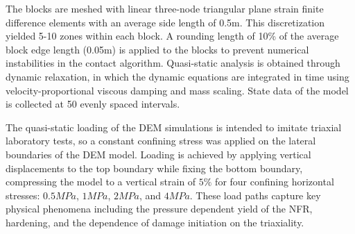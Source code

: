 The blocks are meshed with linear three-node triangular plane strain finite difference elements with an average side length of 0.5m. This discretization yielded 5-10 zones within each block. A rounding length of 10\% of the average block edge length (0.05m) is applied to the blocks to prevent numerical instabilities in the contact algorithm. Quasi-static analysis is obtained through dynamic relaxation, in which the dynamic equations are integrated in time using velocity-proportional viscous damping and mass scaling. State data of the model is collected at 50 evenly spaced intervals. 

The quasi-static loading of the DEM simulations is intended to imitate triaxial laboratory tests, so a constant confining stress was applied on the lateral boundaries of the DEM model. Loading is achieved by applying vertical displacements to the top boundary while fixing the bottom boundary, compressing the model to a vertical strain of $5\%$ for four confining horizontal stresses: $0.5MPa$, $1MPa$, $2MPa$, and $4MPa$. These load paths capture key physical phenomena including the pressure dependent yield of the NFR, hardening, and the dependence of damage initiation on the triaxiality. 


